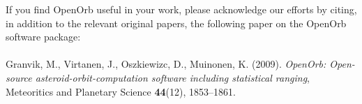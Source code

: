 \documentclass[12pt,english,twoside,a4paper]{report}
\begin{document}
If you find OpenOrb useful in your work, please acknowledge our
efforts by citing, in addition to the relevant original papers, the
following paper on the OpenOrb software package: \\ \\

\noindent Granvik, M., Virtanen, J., Oszkiewizc, D., Muinonen,
K. (2009). \emph{OpenOrb: Open-source asteroid-orbit-computation
  software including statistical ranging}, Meteoritics and Planetary
Science {\bf 44}(12), 1853--1861.




\end{document}
